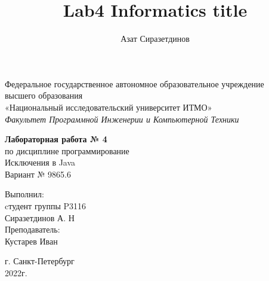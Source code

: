 \documentclass[12pt]{article}
\title{Lab4 Informatics title}
\author{Азат Сиразетдинов}
\begin{document}
    \thispagestyle{empty}
    \begin{center}
        Федеральное государственное автономное образовательное учреждение\\
        высшего образования\\
        «Национальный исследовательский университет ИТМО»\\
        \textit{Факультет Программной Инженерии и Компьютерной Техники}\\
    \end{center}
    \vspace{2cm}
    \begin{center}
        \large
        \textbf{Лабораторная работа № 4}\\
        по дисциплине программирование\\
        Исключения в Java \\
        Вариант № 9865.6
    \end{center}
    \vspace{7cm}
    \begin{flushright}
        Выполнил:\\
        cтудент  группы P3116\\
        Сиразетдинов А. Н\\
        Преподаватель: \\
        Кустарев Иван\\
    \end{flushright}
    \vspace{6cm}
    \begin{center}
        г. Санкт-Петербург\\
        2022г.
    \end{center}
    \newpage
    \tableofcontents
    \newpage
\end{document}
